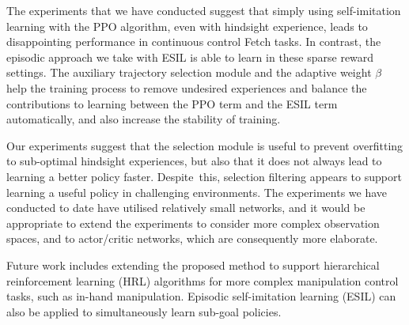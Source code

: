 The experiments that we have conducted suggest that simply using self-imitation learning with the PPO algorithm, even with hindsight experience, leads to disappointing performance in continuous control Fetch tasks. In contrast, the episodic approach we take with ESIL is able to learn in these sparse reward settings. The auxiliary trajectory selection module and the adaptive weight $\beta$ help the training process to remove undesired experiences and balance the contributions to learning between the PPO term and the ESIL term automatically, and also increase the stability of training.

Our experiments suggest that the selection module is useful to prevent overfitting to sub-optimal hindsight experiences, but also that it does not always lead to learning a better policy faster. Despite~this, selection filtering appears to support learning a useful policy in challenging environments. The experiments we have conducted to date have utilised relatively small networks, and it would be appropriate to extend the experiments to consider more complex observation spaces, and to actor/critic networks, which are consequently more elaborate.

Future work includes extending {the proposed} method to support hierarchical reinforcement learning (HRL) algorithms for more complex manipulation control tasks, such as in-hand manipulation. Episodic self-imitation learning (ESIL) can also be applied to simultaneously learn sub-goal policies.